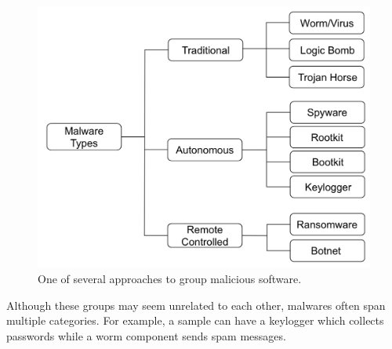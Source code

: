 \documentclass[LaM,binding=0.6cm]{sapthesis}
\begin{document}
\begin{figure}[h!]
\centering
\includegraphics[scale=.5]{images/background1}
\caption{One of several approaches to group malicious software.}
\end{figure}
Although these groups may seem unrelated to each other, malwares often span multiple categories. For example, a sample can have a keylogger which collects passwords while a worm component sends spam messages.

\newpage
\end{document}
